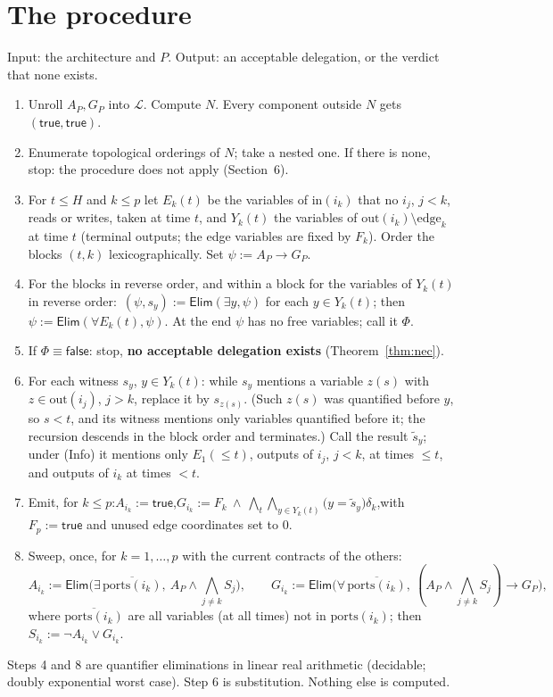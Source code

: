 \documentclass[10pt]{article}
\theoremstyle{plain}\newtheorem{theorem}{Theorem}\newtheorem{lemma}{Lemma}
\theoremstyle{definition}\newtheorem{definition}{Definition}
\newcommand{\inp}{\mathrm{in}}\newcommand{\outp}{\mathrm{out}}\newcommand{\ports}{\mathrm{ports}}\newcommand{\priv}{\mathrm{priv}}\newcommand{\edge}{\mathrm{edge}}
\newcommand{\ELIM}{\mathsf{Elim}}\newcommand{\TRUE}{\mathsf{true}}
\begin{document}
\section{The procedure}
Input: the architecture and $P$. Output: an acceptable delegation, or the verdict that none exists.
\begin{enumerate}
\item Unroll $A_P,G_P$ into $\mathcal L$. Compute $N$. Every component outside $N$ gets $(\TRUE,\TRUE)$.
\item Enumerate topological orderings of $N$; take a nested one. If there is none, stop: the procedure does not apply (Section~6).
\item For $t\le H$ and $k\le p$ let $E_k(t)$ be the variables of $\inp(i_k)$ that no $i_j$, $j<k$, reads or writes, taken at time $t$, and $Y_k(t)$ the variables of $\outp(i_k)\setminus\edge_k$ at time $t$ (terminal outputs; the edge variables are fixed by $F_k$). Order the blocks $(t,k)$ lexicographically. Set $\psi:=A_P\to G_P$.
\item For the blocks in reverse order, and within a block for the variables of $Y_k(t)$ in reverse order:\ $(\psi,s_{y}):=\ELIM(\exists y,\psi)$ for each $y\in Y_k(t)$; then $\psi:=\ELIM(\forall E_k(t),\psi)$. At the end $\psi$ has no free variables; call it $\Phi$.
\item If $\Phi\equiv\mathsf{false}$: stop, \textbf{no acceptable delegation exists} (Theorem~\ref{thm:nec}).
\item For each witness $s_y$, $y\in Y_k(t)$: while $s_y$ mentions a variable $z(s)$ with $z\in\outp(i_j)$, $j>k$, replace it by $s_{z(s)}$. (Such $z(s)$ was quantified before $y$, so $s<t$, and its witness mentions only variables quantified before it; the recursion descends in the block order and terminates.) Call the result $\tilde s_y$; under (Info) it mentions only $E_1(\le t)$, outputs of $i_j$, $j<k$, at times $\le t$, and outputs of $i_k$ at times $<t$.
\item Emit, for $k\le p$:\quad $A_{i_k}:=\TRUE$,\qquad $G_{i_k}:=F_k\ \wedge\ \bigwedge_{t}\bigwedge_{y\in Y_k(t)}\big(y=\tilde s_y\big)\delta_k$,\quad with $F_p:=\TRUE$ and unused edge coordinates set to $0$.
\item Sweep, once, for $k=1,\dots,p$ with the current contracts of the others:
\[
A_{i_k}:=\ELIM\big(\exists\,\overline{\ports(i_k)},\ A_P\wedge\textstyle\bigwedge_{j\ne k}S_j\big),\qquad
G_{i_k}:=\ELIM\big(\forall\,\overline{\ports(i_k)},\ (A_P\wedge\textstyle\bigwedge_{j\ne k}S_j)\to G_P\big),
\]
where $\overline{\ports(i_k)}$ are all variables (at all times) not in $\ports(i_k)$; then $S_{i_k}:=\neg A_{i_k}\vee G_{i_k}$.
\end{enumerate}
Steps 4 and 8 are quantifier eliminations in linear real arithmetic (decidable; doubly exponential worst case). Step 6 is substitution. Nothing else is computed.
\end{document}
